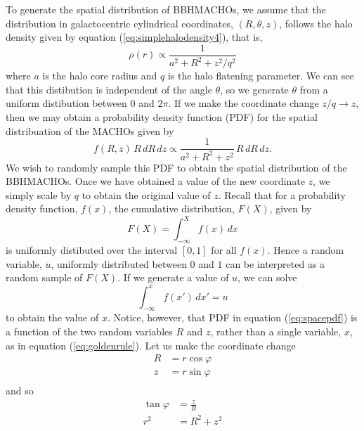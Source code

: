 To generate the spatial distribution of BBHMACHOs, we assume that the
distribution in galactocentric cylindrical coordinates, $(R,\theta,z)$,
follows the halo density given by equation (\ref{eq:simplehalodensity4}),
that is,
\begin{equation}
\rho(r) \propto \frac{1}{a^2 + R^2 + z^2/q^2}
\end{equation}
where $a$ is the halo core radius and $q$ is the halo flatening parameter. We
can see that this distibution is independent of the angle $\theta$, so we
generate $\theta$ from a uniform distibution between $0$ and $2\pi$.  If
we make the coordinate change $z/q \rightarrow z$, then we may obtain a
probability density function (PDF) for the spatial distribuation of
the MACHOs given by
\begin{equation}
f(R,z)\,R\, dR\, dz \propto \frac{1}{a^2 + R^2 + z^2}\,R\, dR\, dz.
\label{eq:spacepdf}
\end{equation}
We wish to randomly sample this PDF to obtain the spatial distribution of
the BBHMACHOs. Once we have obtained a value of the new coordinate $z$, we
simply scale by $q$ to obtain the original value of $z$. Recall that for a
probability density function, $f(x)$, the cumulative distribution, $F(X)$,
given by
\begin{equation}
F(X) = \int_{-\infty}^X f(x)\, dx
\end{equation}
is uniformly distibuted over the interval $[0,1]$ for all $f(x)$. Hence a
random variable, $u$, uniformly distributed between $0$ and $1$ can be
interpreted as a random sample of $F(X)$. If we generate a value of $u$, we
can solve 
\begin{equation}
\int_{-\infty}^x f(x')\, dx' = u
\label{eq:goldenrule}
\end{equation}
to obtain the value of $x$. Notice, however, that PDF in equation
(\ref{eq:spacepdf}) is a function of the two random variables $R$ and $z$,
rather than a single variable, $x$, as in equation (\ref{eq:goldenrule}).
Let us make the coordinate change
\begin{equation}
\begin{split}
R &= r \cos \varphi \\
z &= r \sin \varphi \\
\label{eq:probcoordtrans}
\end{split}
\end{equation}
and so
\begin{equation}
\begin{split}
\tan \varphi &= \frac{z}{R} \\
r^2 &= R^2 + z^2 \\
\end{split}
\end{equation}
